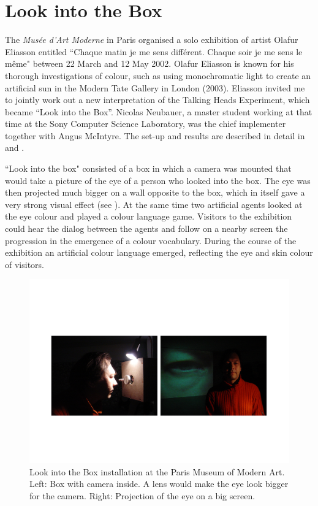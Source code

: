 \section{Look into the Box} 

The {\itshape Mus\'ee d'Art Moderne} in Paris organised a solo exhibition of artist Olafur Eliasson entitled 
``Chaque matin je me sens diff\'erent. Chaque soir je me sens le m\^eme" between 
22 March and 12 May 2002.\cite{Scherf:2002} Olafur Eliasson is known for his thorough 
investigations of colour, such as using monochromatic light to create an artificial sun in the Modern Tate
Gallery in London (2003). Eliasson invited me to jointly work out a new interpretation of the 
Talking Heads Experiment, which became ``Look into the Box''. Nicolas Neubauer, a master student working at 
that time at the Sony Computer Science Laboratory, was the chief implementer together with Angus McIntyre.  
The set-up and results are described in detail in \cite{Steels:2004} and \cite{Neubauer:2004}.

``Look into the box" consisted of a box in which a camera was mounted that would take a picture of the 
eye of a person who looked into the box. The eye was then projected much bigger on a wall opposite to the box, 
which in itself gave a very strong visual effect (see ). 
At the same time two artificial agents looked at the 
eye colour and played a colour language game. Visitors to the exhibition could hear the dialog between the agents 
and follow on a nearby screen the progression in the emergence of a colour vocabulary. During the course of the 
exhibition an artificial colour language emerged, reflecting the eye and skin colour of visitors. 

\begin{figure}[htbp]
  \centerline{\includegraphics[width=.95\textwidth]{chap9/figs/look-into-box.pdf}}
\caption{\label{fig:lookintobox}Look into the Box installation at the Paris Museum of Modern Art. Left: Box with camera inside. A lens would make 
the eye look bigger for the camera. Right: Projection of the eye on a big screen.}
\end{figure}

